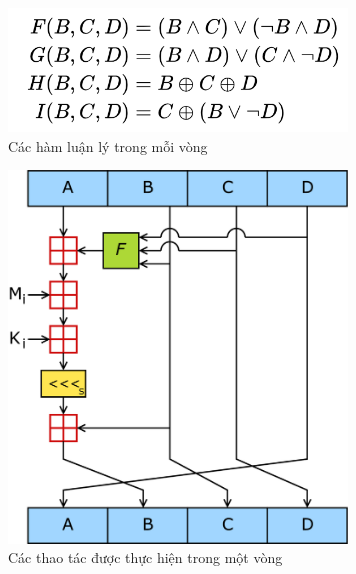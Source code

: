 \documentclass[../report.tex]{subfiles}
\begin{document}
\begin{figure}[H]
    \centering
    \includegraphics[width=9cm]{figures/F.png}
    \caption{Các hàm luận lý trong mỗi vòng}
\end{figure}

\begin{figure}[H]
    \centering
    \includegraphics[width=9cm]{figures/round.png}
    \caption{Các thao tác được thực hiện trong một vòng }
\end{figure}
\end{document}
